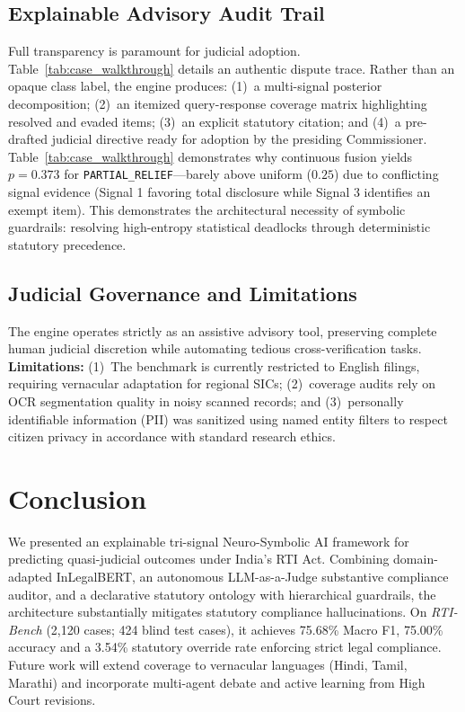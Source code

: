 \documentclass[conference]{IEEEtran}
\begin{document}
\subsection{Explainable Advisory Audit Trail}
Full transparency is paramount for judicial adoption. Table~\ref{tab:case_walkthrough} details an authentic dispute trace. Rather than an opaque class label, the engine produces: (1)~a multi-signal posterior decomposition; (2)~an itemized query-response coverage matrix highlighting resolved and evaded items; (3)~an explicit statutory citation; and (4)~a pre-drafted judicial directive ready for adoption by the presiding Commissioner. Table~\ref{tab:case_walkthrough} demonstrates why continuous fusion yields $p = 0.373$ for \texttt{PARTIAL\_RELIEF}---barely above uniform ($0.25$) due to conflicting signal evidence (Signal 1 favoring total disclosure while Signal 3 identifies an exempt item). This demonstrates the architectural necessity of symbolic guardrails: resolving high-entropy statistical deadlocks through deterministic statutory precedence.

\subsection{Judicial Governance and Limitations}
The engine operates strictly as an assistive advisory tool, preserving complete human judicial discretion while automating tedious cross-verification tasks.
\textbf{Limitations:} (1)~The benchmark is currently restricted to English filings, requiring vernacular adaptation for regional SICs; (2)~coverage audits rely on OCR segmentation quality in noisy scanned records; and (3)~personally identifiable information (PII) was sanitized using named entity filters to respect citizen privacy in accordance with standard research ethics.

\section{Conclusion}
We presented an explainable tri-signal Neuro-Symbolic AI framework for predicting quasi-judicial outcomes under India's RTI Act. Combining domain-adapted InLegalBERT, an autonomous LLM-as-a-Judge substantive compliance auditor, and a declarative statutory ontology with hierarchical guardrails, the architecture substantially mitigates statutory compliance hallucinations. On \textit{RTI-Bench} (2,120 cases; 424 blind test cases), it achieves 75.68\% Macro F1, 75.00\% accuracy and a 3.54\% statutory override rate enforcing strict legal compliance. Future work will extend coverage to vernacular languages (Hindi, Tamil, Marathi) and incorporate multi-agent debate and active learning from High Court revisions.
\end{document}
